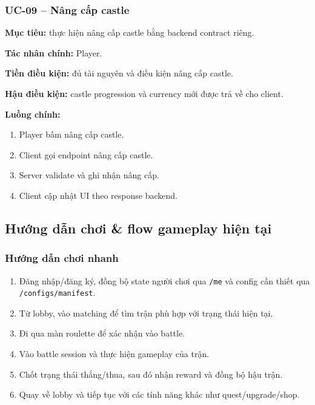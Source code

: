 \subsubsection{UC-09 -- Nâng cấp castle}
\label{subsubsec:uc-09}

\textbf{Mục tiêu:} thực hiện nâng cấp castle bằng backend contract riêng.

\textbf{Tác nhân chính:} Player.

\textbf{Tiền điều kiện:} đủ tài nguyên và điều kiện nâng cấp castle.

\textbf{Hậu điều kiện:} castle progression và currency mới được trả về cho client.

\textbf{Luồng chính:}
\begin{enumerate}
    \item Player bấm nâng cấp castle.
    \item Client gọi endpoint nâng cấp castle.
    \item Server validate và ghi nhận nâng cấp.
    \item Client cập nhật UI theo response backend.
\end{enumerate}

\subsection{Hướng dẫn chơi \& flow gameplay hiện tại}
\label{subsec:analysis_gameplay_guide}

\subsubsection{Hướng dẫn chơi nhanh}
\label{subsubsec:analysis_gameplay_quickstart}
\begin{enumerate}
    \item Đăng nhập/\allowbreak đăng ký, đồng bộ state người chơi qua \texttt{/me} và config cần thiết qua \texttt{/configs/manifest}.
    \item Từ lobby, vào matching để tìm trận phù hợp với trạng thái hiện tại.
    \item Đi qua màn roulette để xác nhận vào battle.
    \item Vào battle session và thực hiện gameplay của trận.
    \item Chốt trạng thái thắng/\allowbreak thua, sau đó nhận reward và đồng bộ hậu trận.
    \item Quay về lobby và tiếp tục với các tính năng khác như quest/\allowbreak upgrade/\allowbreak shop.
\end{enumerate}

